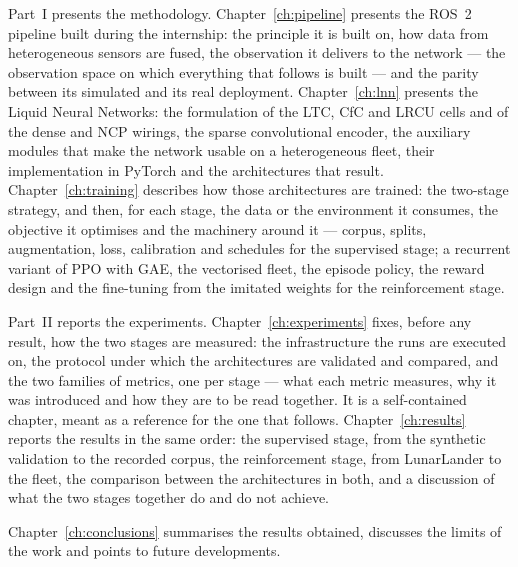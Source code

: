 Part~I presents the methodology. Chapter~\ref{ch:pipeline} presents the ROS~2
pipeline built during the internship: the principle it is built on, how data
from heterogeneous sensors are fused, the observation it delivers to the
network --- the observation space on which everything that follows is built ---
and the parity between its simulated and its real deployment.
Chapter~\ref{ch:lnn} presents the Liquid Neural Networks: the formulation of
the LTC, CfC and LRCU cells and of the dense and NCP wirings, the sparse
convolutional encoder, the auxiliary modules that make the network usable on a
heterogeneous fleet, their implementation in PyTorch and the architectures that
result. Chapter~\ref{ch:training} describes how those architectures are
trained: the two-stage strategy, and then, for each stage, the data or the
environment it consumes, the objective it optimises and the machinery around
it --- corpus, splits, augmentation, loss, calibration and schedules for the
supervised stage; a recurrent variant of PPO with GAE, the vectorised fleet,
the episode policy, the reward design and the fine-tuning from the imitated
weights for the reinforcement stage.

Part~II reports the experiments. Chapter~\ref{ch:experiments} fixes, before any
result, how the two stages are measured: the infrastructure the runs are
executed on, the protocol under which the architectures are validated and
compared, and the two families of metrics, one per stage --- what each metric
measures, why it was introduced and how they are to be read together. It is a
self-contained chapter, meant as a reference for the one that follows.
Chapter~\ref{ch:results} reports the results in the same order: the supervised
stage, from the synthetic validation to the recorded corpus, the reinforcement
stage, from LunarLander to the fleet, the comparison between the architectures
in both, and a discussion of what the two stages together do and do not
achieve.

Chapter~\ref{ch:conclusions} summarises the results obtained, discusses the
limits of the work and points to future developments.
